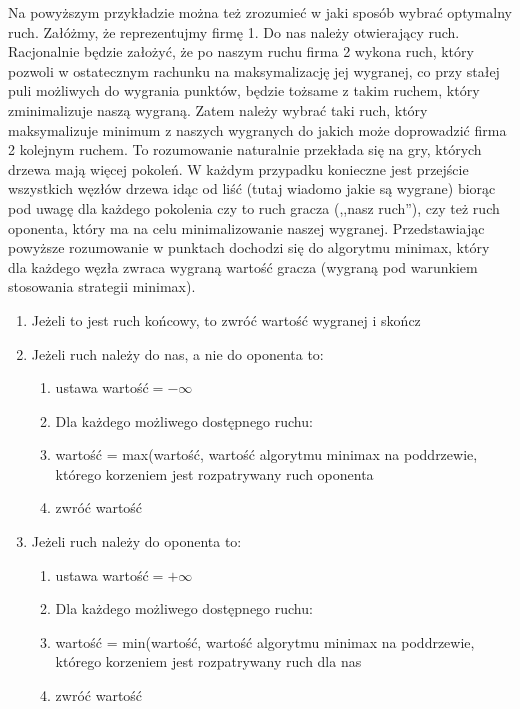 \documentclass[licencjacka]{pracamgr}
\begin{document}
Na powyższym przykładzie można też zrozumieć w jaki sposób wybrać optymalny ruch. Załóżmy, że reprezentujmy firmę 1. Do nas należy otwierający ruch. Racjonalnie będzie założyć, że po naszym ruchu firma 2 wykona ruch, który pozwoli w ostatecznym rachunku na maksymalizację jej wygranej, co przy stałej puli możliwych do wygrania punktów, będzie tożsame z takim ruchem, który zminimalizuje naszą wygraną. Zatem należy wybrać taki ruch, który maksymalizuje minimum z naszych wygranych do jakich może doprowadzić firma 2 kolejnym ruchem.  To rozumowanie naturalnie przekłada się na gry, których drzewa mają więcej pokoleń. W każdym przypadku konieczne jest przejście wszystkich węzłów drzewa idąc od liść (tutaj wiadomo jakie są wygrane) biorąc pod uwagę dla każdego pokolenia czy to ruch gracza (,,nasz ruch''), czy też ruch oponenta, który ma na celu minimalizowanie naszej wygranej. Przedstawiając powyższe rozumowanie w punktach dochodzi się do algorytmu minimax, który dla każdego węzła zwraca wygraną wartość gracza (wygraną pod warunkiem stosowania strategii minimax). \\

\begin{enumerate}
	\item{Jeżeli to jest ruch końcowy, to zwróć wartość wygranej i skończ}
	\item{Jeżeli ruch należy do nas, a nie do oponenta to:}
	\begin{enumerate}
		\item{ustawa wartość$=-\infty$}
		\item{Dla każdego możliwego dostępnego ruchu: }
		\item{wartość = max(wartość,  wartość algorytmu minimax na poddrzewie, którego korzeniem jest rozpatrywany ruch oponenta}
		\item{zwróć wartość}
	\end{enumerate}
		\item{Jeżeli ruch należy do oponenta to:}
	\begin{enumerate}
		\item{ustawa wartość$=+\infty$}
		\item{Dla każdego możliwego dostępnego ruchu: }
		\item{wartość = min(wartość,  wartość algorytmu minimax na poddrzewie, którego korzeniem jest rozpatrywany ruch dla nas}
		\item{zwróć wartość}
	\end{enumerate}
\end{enumerate}
\end{document}
